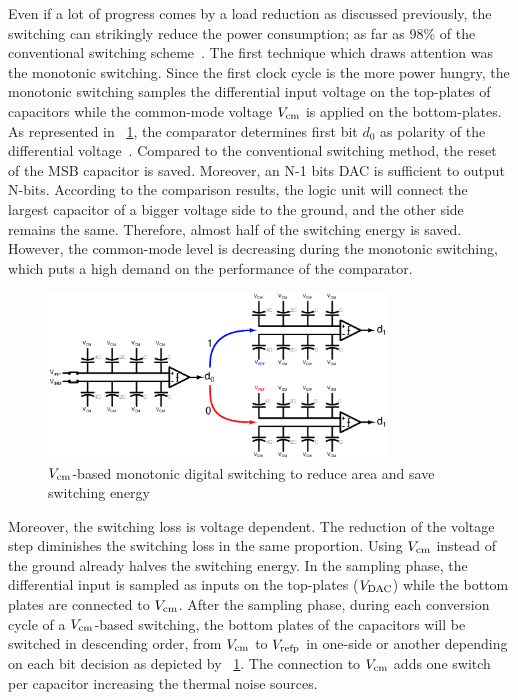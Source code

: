 Even if a lot of progress comes by a load reduction as discussed previously, the switching can strikingly reduce the power consumption; as far as 98\% of the conventional switching scheme~\cite{Zhu2013,Xie2014,Li2016}. The first technique which draws attention was the monotonic switching. Since the first clock cycle is the more power hungry, the monotonic switching samples the differential input voltage on the top-plates of capacitors while the common-mode voltage \(V_{\rm cm}\) is applied on the bottom-plates. As represented in \figurename~\ref{fig:sar_vcm_monotonic}, the comparator determines first bit \(d_0\) as polarity of the differential voltage~\cite{Ginsburg2005}. Compared to the conventional switching method, the reset of the MSB capacitor is saved. Moreover, an N-1 bits DAC is sufficient to output N-bits.  According to the comparison results, the logic unit will connect the largest capacitor of a bigger voltage side to the ground, and the other side remains the same. Therefore, almost half of the switching energy is saved. However, the common-mode level is decreasing during the monotonic switching, which puts a high demand on the performance of the comparator.

\begin{figure}[htp]
	\centering
	\includegraphics[width=0.8\textwidth]{Chapter3/Figs/sar_vcm_monotonic.ps}
	\caption{\(V_{\rm cm}\)-based monotonic digital switching to reduce area and save switching energy}
	\label{fig:sar_vcm_monotonic}
\end{figure}

Moreover, the switching loss is voltage dependent. The reduction of the voltage step diminishes the switching loss in the same proportion. Using \(V_{\rm cm}\) instead of the ground already halves the switching energy. In the sampling phase, the differential input is sampled as inputs on the top-plates (\(V_{\rm DAC}\)) while the bottom plates are connected to \(V_{\rm cm}\). After the sampling phase, during each conversion cycle of a \(V_{\rm cm}\)-based switching, the bottom plates of the capacitors will be switched in descending order, from \(V_{\rm cm}\) to \(V_{\rm refp}\) in one-side or another depending on each bit decision as depicted by \figurename~\ref{fig:sar_vcm_monotonic}. The connection to \(V_{\rm cm}\) adds one switch per capacitor increasing the thermal noise sources.

